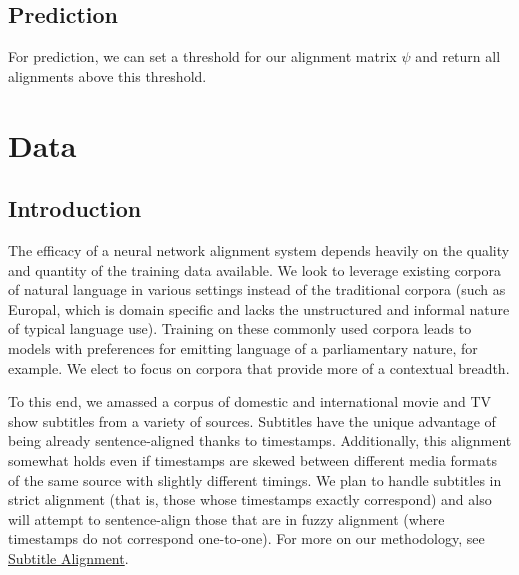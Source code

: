\documentclass[twoside,twocolumn]{article}
\begin{document}


\subsection{Prediction}

For prediction, we can set a threshold for our alignment matrix $\psi$ and
return all alignments above this threshold.


\section{Data}



\subsection{Introduction}

The efficacy of a neural network alignment system depends heavily on the
quality and quantity of the training data available. We look to leverage
existing corpora of natural language in various settings instead of the
traditional corpora (such as Europal, which is domain specific and lacks the
unstructured and informal nature of typical language use). Training on these
commonly used corpora leads to models with preferences for emitting language
of a parliamentary nature, for example. We elect to focus on corpora that
provide more of a contextual breadth.

To this end, we amassed a corpus of domestic and international movie and TV
show subtitles from a variety of sources. Subtitles have the unique advantage
of being already sentence-aligned thanks to timestamps. Additionally, this
alignment somewhat holds even if timestamps are skewed between different media
formats of the same source with slightly different timings. We plan to handle
subtitles in strict alignment (that is, those whose timestamps exactly
correspond) and also will attempt to sentence-align those that are in fuzzy
alignment (where timestamps do not correspond one-to-one). For more on our
methodology, see \hyperref[subsec:subtitle-alignment]{Subtitle Alignment}.
\end{document}
